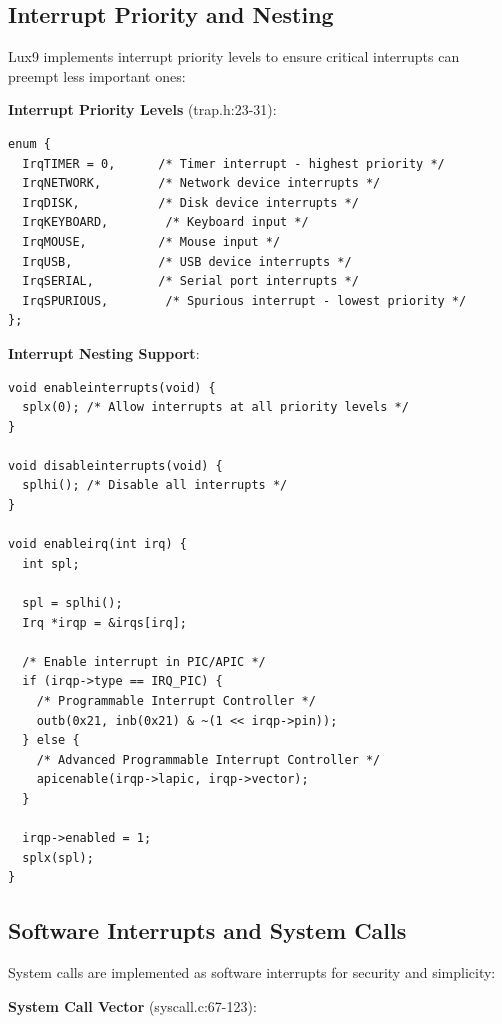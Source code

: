 \documentclass[11pt,letterpaper]{article}
\begin{document}
\subsection{Interrupt Priority and Nesting}

Lux9 implements interrupt priority levels to ensure critical interrupts can preempt less important ones:

\textbf{Interrupt Priority Levels} (trap.h:23-31):

\begin{lstlisting}
enum {
  IrqTIMER = 0,      /* Timer interrupt - highest priority */
  IrqNETWORK,        /* Network device interrupts */
  IrqDISK,           /* Disk device interrupts */
  IrqKEYBOARD,        /* Keyboard input */
  IrqMOUSE,          /* Mouse input */
  IrqUSB,            /* USB device interrupts */
  IrqSERIAL,         /* Serial port interrupts */
  IrqSPURIOUS,        /* Spurious interrupt - lowest priority */
};
\end{lstlisting}

\textbf{Interrupt Nesting Support}:

\begin{lstlisting}
void enableinterrupts(void) {
  splx(0); /* Allow interrupts at all priority levels */
}

void disableinterrupts(void) {
  splhi(); /* Disable all interrupts */
}

void enableirq(int irq) {
  int spl;
  
  spl = splhi();
  Irq *irqp = &irqs[irq];
  
  /* Enable interrupt in PIC/APIC */
  if (irqp->type == IRQ_PIC) {
    /* Programmable Interrupt Controller */
    outb(0x21, inb(0x21) & ~(1 << irqp->pin));
  } else {
    /* Advanced Programmable Interrupt Controller */
    apicenable(irqp->lapic, irqp->vector);
  }
  
  irqp->enabled = 1;
  splx(spl);
}
\end{lstlisting}

\subsection{Software Interrupts and System Calls}

System calls are implemented as software interrupts for security and simplicity:

\textbf{System Call Vector} (syscall.c:67-123):
\end{document}
